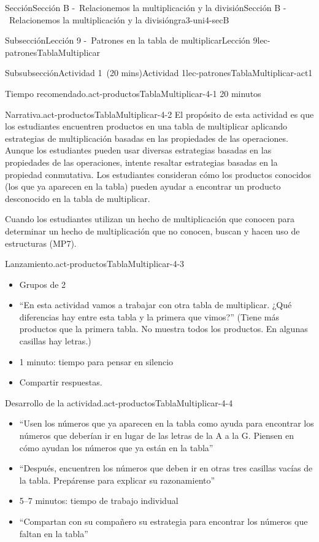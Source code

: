 \documentclass[oneside,10pt,]{article}
\begin{document}
\begin{sectionptx}{Sección}{Sección B -~Relacionemos la multiplicación y la división}{}{Sección B -~Relacionemos la multiplicación y la división}{}{}{gra3-uni4-secB}
\begin{subsectionptx}{Subsección}{Lección 9 -~Patrones en la tabla de multiplicar}{}{Lección 9}{}{}{lec-patronesTablaMultiplicar}
\begin{subsubsectionptx}{Subsubsección}{Actividad 1~(20 mins)}{}{Actividad 1}{}{}{lec-patronesTablaMultiplicar-act1}
\begin{paragraphs}{Tiempo recomendado.}{act-productosTablaMultiplicar-4-1}
20 minutos%
\end{paragraphs}%
\begin{paragraphs}{Narrativa.}{act-productosTablaMultiplicar-4-2}%
El propósito de esta actividad es que los estudiantes encuentren productos en una tabla de multiplicar aplicando estrategias de multiplicación basadas en las propiedades de las operaciones. Aunque los estudiantes pueden usar diversas estrategias basadas en las propiedades de las operaciones, intente resaltar estrategias basadas en la propiedad conmutativa. Los estudiantes consideran cómo los productos conocidos (los que ya aparecen en la tabla) pueden ayudar a encontrar un producto desconocido en la tabla de multiplicar.%
\par
Cuando los estudiantes utilizan un hecho de multiplicación que conocen para determinar un hecho de multiplicación que no conocen, buscan y hacen uso de estructuras (MP7).%
\end{paragraphs}%
\begin{paragraphs}{Lanzamiento.}{act-productosTablaMultiplicar-4-3}%
%
\begin{itemize}[label=\textbullet]
\item{}Grupos de 2%
\item{}``En esta actividad vamos a trabajar con otra tabla de multiplicar. ¿Qué diferencias hay entre esta tabla y la primera que vimos?'' (Tiene más productos que la primera tabla. No muestra todos los productos. En algunas casillas hay letras.)%
\item{}1 minuto: tiempo para pensar en silencio%
\item{}Compartir respuestas.%
\end{itemize}
\end{paragraphs}%
\begin{paragraphs}{Desarrollo de la actividad.}{act-productosTablaMultiplicar-4-4}%
%
\begin{itemize}[label=\textbullet]
\item{}``Usen los números que ya aparecen en la tabla como ayuda para encontrar los números que deberían ir en lugar de las letras de la A a la G. Piensen en cómo ayudan los números que ya están en la tabla''%
\item{}``Después, encuentren los números que deben ir en otras tres casillas vacías de la tabla. Prepárense para explicar su razonamiento''%
\item{}5–7 minutos: tiempo de trabajo individual%
\item{}``Compartan con su compañero su estrategia para encontrar los números que faltan en la tabla''%

\end{itemize}
\end{paragraphs}
\end{subsubsectionptx}
\end{subsectionptx}
\end{sectionptx}
\end{document}
